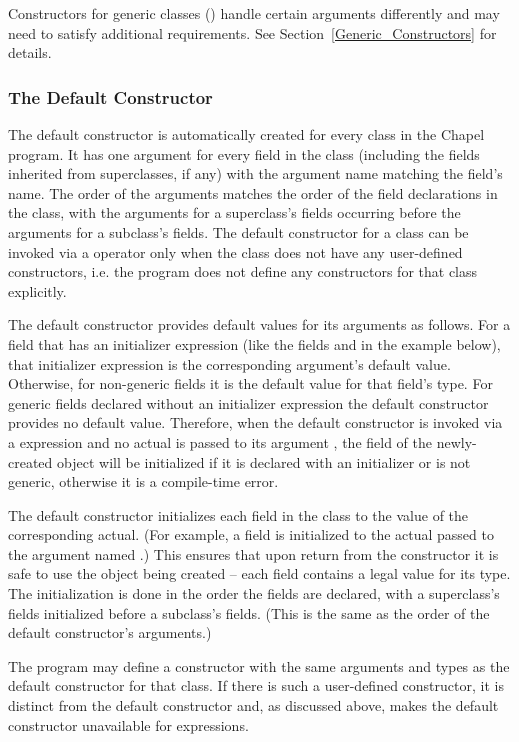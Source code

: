Constructors for generic classes () handle certain
arguments differently and may need to satisfy additional
requirements. See Section~\ref{Generic_Constructors} for details.

\subsubsection{The Default Constructor}
\label{The_Default_Constructor}

The default constructor is automatically created for every class in
the Chapel program. It has one argument for every field in the class
(including the fields inherited from superclasses, if any)
with the argument name matching the field's name.
The order of the arguments matches the order of the field declarations
in the class, with the arguments for a superclass's fields occurring
before the arguments for a subclass's fields.
The default constructor for a class can be invoked via a 
operator only when the class does not have any user-defined constructors,
i.e. the program does not define any constructors for
that class explicitly.

The default constructor provides default values for its arguments as follows.
For a field that has an initializer expression (like the
fields  and  in the example below), that initializer
expression is the corresponding argument's default value.
Otherwise, for non-generic fields it is the default value for that
field's type.
For generic fields declared without an initializer expression the
default constructor provides no default value.
Therefore, when the default constructor is invoked via a 
expression and no actual is passed to its argument , the
field  of the newly-created object will be initialized if it
is declared with an initializer or is not generic, otherwise it is a
compile-time error.

The default constructor initializes each field in the class to the
value of the corresponding actual. (For example, a field  is
initialized to the actual passed to the argument named .)
This ensures that upon return from the constructor it is safe to use
the object being created -- each field contains a legal value for its type.
The initialization is done in the order the fields are declared, with
a superclass's fields initialized before a subclass's fields.
(This is the same as the order of the default constructor's arguments.)

The program may define a constructor with the same arguments and types
as the default constructor for that class. If there is such a
user-defined constructor, it is distinct from the default
constructor and, as discussed above, makes the default constructor
unavailable for  expressions.

